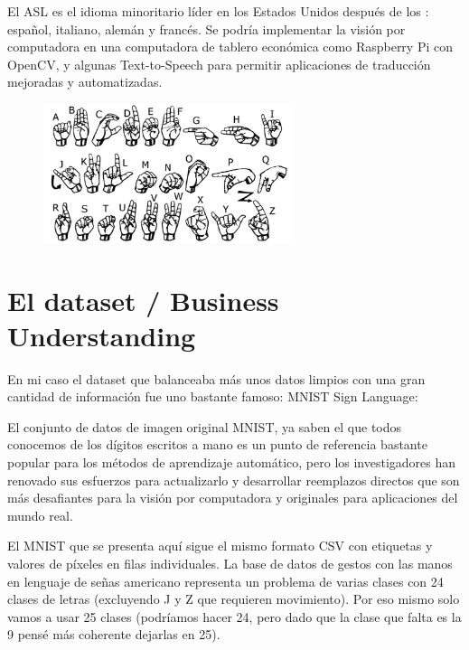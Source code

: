 \documentclass[12pt, fleqn]{report}                             %
\newcommand \Quote              {\qq}                           %
\theoremstyle{break}                                            %
\begin{document}
        El ASL es el idioma minoritario líder en los Estados Unidos después de los \Quote{cuatro grandes}: español, italiano,
        alemán y francés. Se podría implementar la visión por computadora en una computadora de tablero económica
        como Raspberry Pi con OpenCV, y algunas Text-to-Speech para permitir aplicaciones
        de traducción mejoradas y automatizadas.


        \begin{figure}[ht!]
            \centering
            \includegraphics[width=0.65\textwidth]{images}
        \end{figure}

    \chapter{El dataset / Business Understanding}

        En mi caso el dataset que balanceaba más unos datos limpios con una gran cantidad de información fue uno bastante famoso:
        MNIST Sign Language:
        
        El conjunto de datos de imagen original MNIST, ya saben el que todos conocemos de los dígitos escritos a mano es un
        punto de referencia bastante popular para los métodos de aprendizaje automático,
        pero los investigadores han renovado sus esfuerzos para actualizarlo y desarrollar reemplazos
        directos que son más desafiantes para la visión por computadora y originales para aplicaciones del mundo real.
        
        El MNIST que se presenta aquí sigue el mismo formato CSV con etiquetas y valores de píxeles en filas individuales.
        La base de datos de gestos con las manos en lenguaje de señas americano representa un
        problema de varias clases con 24 clases de letras (excluyendo J y Z que requieren movimiento).
        Por eso mismo solo vamos a usar 25 clases (podríamos hacer 24, pero dado que la clase que falta es la 9 pensé más coherente
        dejarlas en 25).
        
\end{document}
